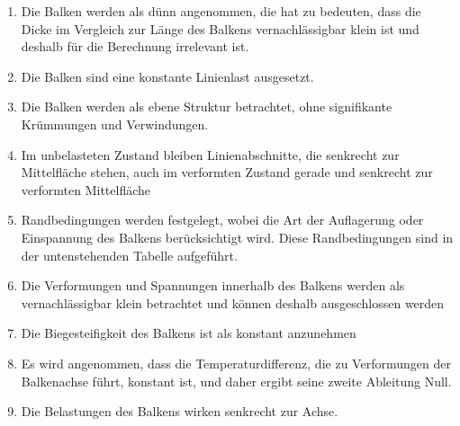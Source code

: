 \begin{enumerate}
	\item Die Balken werden als dünn angenommen, die hat zu bedeuten, dass die Dicke im Vergleich zur Länge des Balkens vernachlässigbar klein ist und deshalb für die Berechnung irrelevant ist.
	\item Die Balken sind eine konstante Linienlast ausgesetzt.
	\item Die Balken werden als ebene Struktur betrachtet, ohne signifikante Krümmungen und Verwindungen.
	\item Im unbelasteten Zustand bleiben Linienabschnitte, die senkrecht zur Mittelfläche stehen, auch im verformten Zustand gerade und senkrecht zur verformten Mittelfläche
	\item Randbedingungen werden festgelegt, wobei die Art der Auflagerung oder Einspannung des Balkens berücksichtigt wird.
	Diese Randbedingungen sind in der untenstehenden Tabelle aufgeführt.
	\item Die Verformungen und Spannungen innerhalb des Balkens werden als vernachlässigbar klein betrachtet und können deshalb ausgeschlossen werden
	\item Die Biegesteifigkeit des Balkens ist als konstant anzunehmen
	\item Es wird angenommen, dass die Temperaturdifferenz, die zu Verformungen der Balkenachse führt, konstant ist, und daher ergibt seine zweite Ableitung Null.
	\item Die Belastungen des Balkens wirken senkrecht zur Achse.
\end{enumerate}